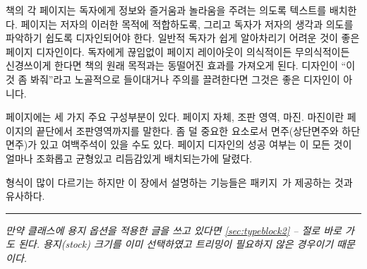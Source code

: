 책의 각 페이지는 독자에게 정보와 즐거움과 놀라움을 주려는 의도록 텍스트를 배치한다.
페이지는 저자의 이러한 목적에 적합하도록, 그리고 독자가 저자의 생각과 의도를
파악하기 쉽도록 디자인되어야 한다.
일반적 독자가 쉽게 알아차리기 어려운 것이 좋은 페이지 디자인이다. 독자에게
끊임없이 페이지 레이아웃이 의식적이든 무의식적이든 신경쓰이게 한다면 
책의 원래 목적과는 동떨어진 효과를 가져오게 된다. 
디자인이 “이것 좀 봐줘”라고 노골적으로 들이대거나 주의를 끌려한다면
그것은 좋은 디자인이 아니다.

페이지에는 세 가지 주요 구성부분이 있다. 페이지 자체, 조판 영역, 마진. 마진이란 페이지의 끝단에서 조판영역까지를 말한다.
좀 덜 중요한 요소로서 면주(상단면주와 하단면주)가 있고 여백주석이 있을 수도 있다.
페이지 디자인의 성공 여부는 이 모든 것이 얼마나 조화롭고 균형있고 리듬감있게
배치되는가에 달렸다.

형식이 많이 다르기는 하지만 이 장에서 설명하는 기능들은  패키지~\cite{GEOMETRY}가 제공하는 것과 유사하다.

\fancybreak{}

\begin{adjustwidth}{3em}{3em}
  \itshape
만약 클래스에 용지 옵션을 적용한 글을 쓰고 있다면 \ref{sec:typeblock2} -- \emph{} 절로
바로 가도 된다. 용지(stock) 크기를 이미 선택하였고 트리밍이 필요하지 않은
경우이기 때문이다.
\end{adjustwidth}

